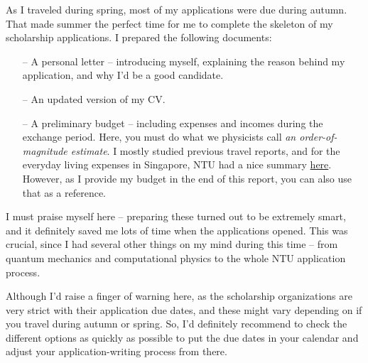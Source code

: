 As I traveled during spring, most of my applications were due during autumn. That made summer the perfect time for me to complete the skeleton of my scholarship applications. I prepared the following documents:
\begin{enumerate}
    \item[--] A personal letter -- introducing myself, explaining the reason behind my application, and why I'd be a good candidate.
    \item[--] An updated version of my CV.
    \item[--] A preliminary budget -- including expenses and incomes during the exchange period. Here, you must do what we physicists call \textit{an order-of-magnitude estimate}. I mostly studied previous travel reports, and for the everyday living expenses in Singapore, NTU had a nice summary \href{https://www.ntu.edu.sg/eee/admissions/programmes/graduate-programmes/international-students}{here}. However, as I provide my budget in the end of this report, you can also use that as a reference.
\end{enumerate}
\vspace{-0.3cm}
I must praise myself here -- preparing these turned out to be extremely smart, and it definitely saved me lots of time when the applications opened. This was crucial, since I had several other things on my mind during this time -- from quantum mechanics and computational physics to the whole NTU application process.

Although I'd raise a finger of warning here, as the scholarship organizations are very strict with their application due dates, and these might vary depending on if you travel during autumn or spring. So, I'd definitely recommend to check the different options as quickly as possible to put the due dates in your calendar and adjust your application-writing process from there.

\hrulefill

